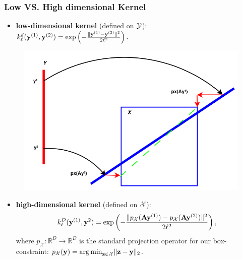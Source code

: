 \documentclass[grey]{beamer}
\begin{document}
 \begin{frame}
  \frametitle{Low VS. High dimensional Kernel}
  \begin{minipage}[l]{0.56\columnwidth}
    \begin{itemize}
    \small
   \item {\bf \textcolor{myColor}{low-dimensional kernel}} (defined on 
   {\bf \textcolor{myColor}{$\cal Y$}}):\\
   $k_{\ell}^d(\mathbf{y}^{(1)},\mathbf{y}^{(2)}) = \exp\left({-\frac{\|\mathbf{y}^{(1)}-\mathbf{y}^{(2)}\|^2}{2\ell^2}}\right). $
  \end{itemize}
  \end{minipage}
 \begin{minipage}[r]{0.42\columnwidth}
  \begin{figure}
  \begin{flushright}
   \includegraphics[width=1\columnwidth]{./figs/low_high_dim.png}
   \end{flushright}
  \end{figure}
 \end{minipage}
 \begin{itemize}
 \small
  \item {\bf \textcolor{myColor}{high-dimensional kernel}} (defined on 
   {\bf \textcolor{myColor}{$\cal X$}}):  
  $$k_{\ell}^D(\mathbf{y}^{(1)}, \mathbf{y}^2) = \exp\left( -\frac{\| p_{\mathcal{X}}(\mathbf{A}\mathbf{y}^{(1)}) - p_{\mathcal{X}}(\mathbf{A}\mathbf{y}^{(2)}) \|^2}{2\ell^2} \right),$$
  where $p_{\mathcal{X}}:\mathbb{R}^D \rightarrow \mathbb{R}^D$ is the standard projection operator for our box-constraint: $p_{\mathcal{X}}(\mathbf{y}) = {\arg \min}_{\mathbf{z}\in \mathcal{X}} \|\mathbf{z}-\mathbf{y}\|_2$. 
  \end{itemize}
 \end{frame}
\end{document}
